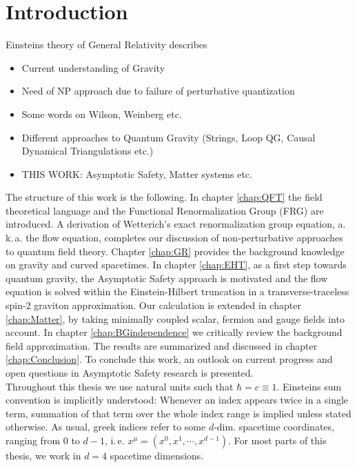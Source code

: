 \chapter{Introduction}
Einsteins theory of General Relativity describes 


\begin{itemize}
	\item Current understanding of Gravity
	\item Need of NP approach due to failure of perturbative quantization
	\item Some words on Wilson, Weinberg etc.
	\item Different approaches to Quantum Gravity (Strings, Loop QG, Causal Dynamical Triangulations etc.)
	\item THIS WORK: Asymptotic Safety, Matter systems etc.
\end{itemize}

The structure of this work is the following. In chapter \ref{chap:QFT} the field theoretical language and the Functional Renormalization Group (FRG) are introduced. A derivation of Wetterich's exact renormalization group equation, a.\,k.\,a. the flow equation,  completes our discussion of non-perturbative approaches to quantum field theory. Chapter \ref{chap:GR} provides the background knowledge on gravity and curved spacetimes. In chapter \ref{chap:EHT}, as a first step towards quantum gravity, the Asymptotic Safety approach is motivated and the flow equation is solved within the Einstein-Hilbert truncation in a transverse-traceless spin-2 graviton approximation. Our calculation is extended in chapter \ref{chap:Matter}, by taking minimally coupled scalar, fermion and gauge fields into account. In chapter \ref{chap:BGindependence} we critically review the background field approximation.
The results are summarized and discussed in chapter \ref{chap:Conclusion}. To conclude this work, an outlook on current progress and open questions in Asymptotic Safety research is presented.\\
 Throughout this thesis we use natural units such that $\hbar = c  \equiv 1$. Einsteins sum convention is implicitly understood: Whenever an index appears twice in a single term, summation of that term over the whole index range is implied unless stated otherwise. As usual, greek indices refer to some $d$-dim. spacetime coordinates, ranging from $0$ to $d-1$, i.\,e. $x^{\mu} = (x^0, x^1, \cdots, x^{d-1})$. For most parts of this thesis, we work in $d=4$ spacetime dimensions.

